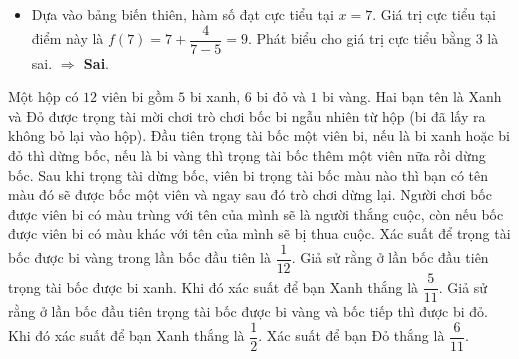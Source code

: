 \documentclass[12pt,a4paper]{article}
\begin{document}
\begin{ex}
{\begin{apdungbox}
\begin{itemize}
    \item[d)] Dựa vào bảng biến thiên, hàm số đạt cực tiểu tại $x=7$. 
    Giá trị cực tiểu tại điểm này là $f(7) = 7 + \dfrac{4}{7-5} = 9$.
    Phát biểu cho giá trị cực tiểu bằng $3$ là sai.
    \textbf{$\Rightarrow$ Sai}.
\end{itemize}
\end{apdungbox}
}
\end{ex}
\begin{ex}
Một hộp có $12$ viên bi gồm $5$ bi xanh, $6$ bi đỏ và $1$ bi vàng. Hai bạn tên là Xanh và Đỏ được trọng tài mời chơi trò chơi bốc bi ngẫu nhiên từ hộp (bi đã lấy ra không bỏ lại vào hộp). Đầu tiên trọng tài bốc một viên bi, nếu là bi xanh hoặc bi đỏ thì dừng bốc, nếu là bi vàng thì trọng tài bốc thêm một viên nữa rồi dừng bốc. Sau khi trọng tài dừng bốc, viên bi trọng tài bốc màu nào thì bạn có tên màu đó sẽ được bốc một viên và ngay sau đó trò chơi dừng lại. Người chơi bốc được viên bi có màu trùng với tên của mình sẽ là người thắng cuộc, còn nếu bốc được viên bi có màu khác với tên của mình sẽ bị thua cuộc.
\choiceTF
{\True Xác suất để trọng tài bốc được bi vàng trong lần bốc đầu tiên là $\dfrac{1}{12}$.}
{Giả sử rằng ở lần bốc đầu tiên trọng tài bốc được bi xanh. Khi đó xác suất để bạn Xanh thắng là $\dfrac{5}{11}$.}
{Giả sử rằng ở lần bốc đầu tiên trọng tài bốc được bi vàng và bốc tiếp thì được bi đỏ. Khi đó xác suất để bạn Xanh thắng là $\dfrac{1}{2}$.}
{Xác suất để bạn Đỏ thắng là $\dfrac{6}{11}$.}
\end{ex}
\end{document}
